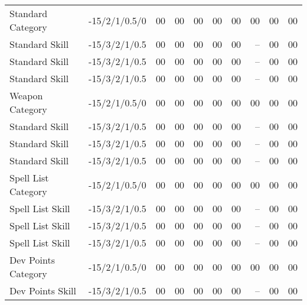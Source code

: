 \begin{center}
\begin{longtable}{llrrrrrrrr}
\endlastfoot
\hline
Standard Category & -15/2/1/0.5/0 & 00 & 00 & 00 & 00 &00 &00 &00&00\\
\hspace{4mm} Standard Skill & -15/3/2/1/0.5 & 00 & 00 & 00 & 00 &00 &-- &00&00\\
\hspace{4mm} Standard Skill & -15/3/2/1/0.5 & 00 & 00 & 00 & 00 &00 &-- &00&00\\
\hspace{4mm} Standard Skill & -15/3/2/1/0.5 & 00 & 00 & 00 & 00 &00 &-- &00&00\\
\hline
\rowcolor{Red}Weapon Category & -15/2/1/0.5/0 & 00 & 00 & 00 & 00 &00 &00 &00&00\\
\rowcolor{Red}\hspace{4mm} Standard Skill & -15/3/2/1/0.5 & 00 & 00 & 00 & 00 &00 &-- &00&00\\
\rowcolor{Red}\hspace{4mm} Standard Skill & -15/3/2/1/0.5 & 00 & 00 & 00 & 00 &00 &-- &00&00\\
\rowcolor{Red}\hspace{4mm} Standard Skill & -15/3/2/1/0.5 & 00 & 00 & 00 & 00 &00 &-- &00&00\\
\hline
\rowcolor{ProcessBlue}Spell List Category & -15/2/1/0.5/0 & 00 & 00 & 00 & 00 &00 &00 &00&00\\
\rowcolor{ProcessBlue}\hspace{4mm} Spell List Skill & -15/3/2/1/0.5 & 00 & 00 & 00 & 00 &00 &-- &00&00\\
\rowcolor{ProcessBlue}\hspace{4mm} Spell List Skill & -15/3/2/1/0.5 & 00 & 00 & 00 & 00 &00 &-- &00&00\\
\rowcolor{ProcessBlue}\hspace{4mm} Spell List Skill & -15/3/2/1/0.5 & 00 & 00 & 00 & 00 &00 &-- &00&00\\
\rowcolor{Green}Dev Points Category & -15/2/1/0.5/0 & 00 & 00 & 00 & 00 &00 &00 &00&00\\
\rowcolor{Green}\hspace{4mm}Dev Points Skill & -15/3/2/1/0.5 & 00 & 00 & 00 & 00 &00 &-- &00&00\\

\end{longtable}
\end{center}
